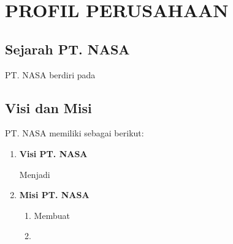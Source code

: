 \chapter{PROFIL PERUSAHAAN}
\vspace{4ex}

\setlength{\parindent}{7ex}

\section{Sejarah PT. NASA}
\vspace{1ex}

PT. NASA berdiri pada \lipsum[1]
\vspace{0.5ex}

\lipsum[2]
\vspace{0.5ex}

\newpage

\section{Visi dan Misi}
\vspace{1ex}

PT. NASA memiliki \lipsum[1][1] sebagai berikut:
\vspace{0.5ex}

\begin{enumerate}[nolistsep]

  \item \textbf{Visi PT. NASA}
  \vspace{0.5ex}

  Menjadi \lipsum[1][1-3]
  \vspace{0.5ex}

  \item \textbf{Misi PT. NASA}
  \vspace{0.5ex}

  \begin{enumerate}[nolistsep]

    \item Membuat \lipsum[1][1-2]
    \vspace{0.5ex}

    \item \lipsum[1][3-4]
    \vspace{0.5ex}

  \end{enumerate}
  \vspace{0.5ex}

\end{enumerate}
\vspace{0.5ex}

